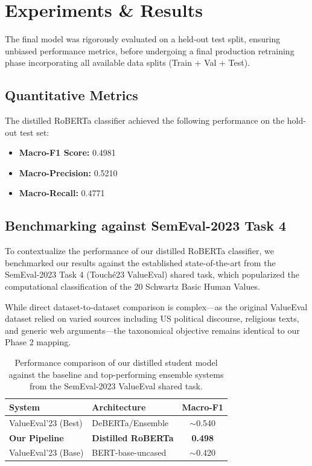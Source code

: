 \documentclass[11pt,a4paper]{article}
\begin{document}
\section{Experiments \& Results}
The final model was rigorously evaluated on a held-out test split, ensuring unbiased performance metrics, before undergoing a final production retraining phase incorporating all available data splits (Train + Val + Test).

\subsection{Quantitative Metrics}
The distilled RoBERTa classifier achieved the following performance on the hold-out test set:
\begin{itemize}
    \item \textbf{Macro-F1 Score:} 0.4981
    \item \textbf{Macro-Precision:} 0.5210
    \item \textbf{Macro-Recall:} 0.4771
\end{itemize}

\subsection{Benchmarking against SemEval-2023 Task 4}
To contextualize the performance of our distilled RoBERTa classifier, we benchmarked our results against the established state-of-the-art from the SemEval-2023 Task 4 (Touché23 ValueEval) shared task, which popularized the computational classification of the 20 Schwartz Basic Human Values. 

While direct dataset-to-dataset comparison is complex—as the original ValueEval dataset relied on varied sources including US political discourse, religious texts, and generic web arguments—the taxonomical objective remains identical to our Phase 2 mapping. 

\begin{table}[htbp]
    \centering
    \begin{tabular}{llc}
    \toprule
    \textbf{System} & \textbf{Architecture} & \textbf{Macro-F1} \\
    \midrule
    ValueEval'23 (Best) & DeBERTa/Ensemble & $\sim$0.540 \\
    \textbf{Our Pipeline} & \textbf{Distilled RoBERTa} & \textbf{0.498} \\
    ValueEval'23 (Base) & BERT-base-uncased & $\sim$0.420 \\
    \bottomrule
    \end{tabular}
    \caption{Performance comparison of our distilled student model against the baseline and top-performing ensemble systems from the SemEval-2023 ValueEval shared task.}
    \label{tab:semeval_comparison}
\end{table}
\end{document}
